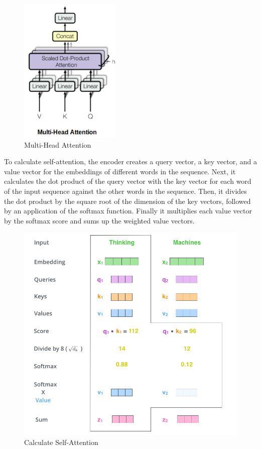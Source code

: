 \documentclass[conference]{IEEEtran}
\begin{document}
	\begin{figure}[!htbp]
		\centering
		\includegraphics{figures/figure3.png}
		\caption{\label{fig:my-label} Multi-Head Attention \cite{attention}}
	\end{figure}
	
	To calculate self-attention, the encoder creates a query vector, a key vector, and a value vector for the embeddings of different words in the sequence. Next, it calculates the dot product of the query vector with the key vector for each word of the input sequence against the other words in the sequence. Then, it divides the dot product by the square root of the dimension of the key vectors, followed by an application of the softmax function. Finally it multiplies each value vector by the softmax score and sums up the weighted value vectors.\\
	
	\begin{figure}[!htbp]
		\centering
		\includegraphics[scale=0.3]{figures/figure4.png}
		\caption{\label{fig:my-label} Calculate Self-Attention \cite{self-attention}}
	\end{figure}
		
\end{document}
